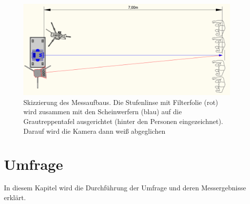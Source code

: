 \begin{figure}[H]     %
\centering
\includegraphics[width=1.0\textwidth]{bilder/aufbaumessung2} 
\caption {Skizzierung des Messaufbaus. Die Stufenlinse mit Filterfolie (rot) wird zusammen mit den Scheinwerfern (blau) auf die Grautreppentafel ausgerichtet (hinter den Personen eingezeichnet). Darauf wird die Kamera dann weiß abgeglichen}\label{b_aufbaumessung2}
\end{figure}



\chapter{Umfrage}
In diesem Kapitel wird die Durchführung der Umfrage und deren Messergebnisse erklärt.
